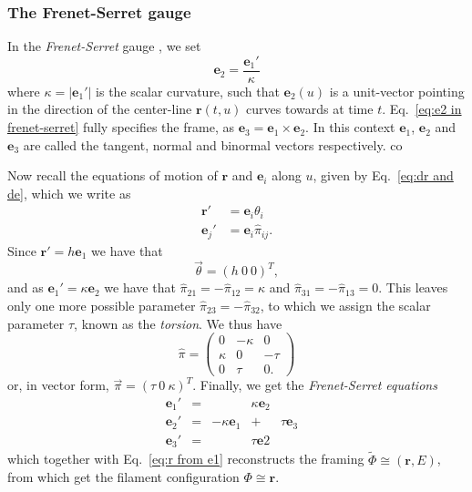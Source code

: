 \subsubsection*{The Frenet-Serret gauge}

In the \textit{Frenet-Serret} gauge \citep{frenetCourbesDoubleCourbure1852, serretQuelquesFormulesRelatives1851}, we set
\begin{equation} \label{eq:e2 in frenet-serret}
\mathbf{e}_2 = \frac{\mathbf{e}_1'}{\kappa}
\end{equation}
where $\kappa = |\mathbf{e}_1'|$ is the scalar curvature, such that $\mathbf{e}_2(u)$ is a unit-vector pointing in the direction of the center-line $\mathbf{r}(t,u)$ curves towards at time $t$. Eq.~\ref{eq:e2 in frenet-serret} fully specifies the frame, as $\mathbf{e}_3 = \mathbf{e}_1 \times \mathbf{e}_2$. In this context $\mathbf{e}_1$, $\mathbf{e}_2$ and $\mathbf{e}_3$ are called the tangent, normal and binormal vectors respectively. co

Now recall the equations of motion of $\mathbf{r}$ and $\mathbf{e}_i$ along $u$, given by Eq.~\ref{eq:dr and de}, which we write as
\begin{subequations}
\begin{align}
\mathbf{r}' & = \mathbf{e}_i \theta_i \\
\mathbf{e}_j' & = \mathbf{e}_i \hat{\pi}_{ij}.
\end{align}
\end{subequations}
Since $\mathbf{r}' = h \mathbf{e}_1$ we have that
\begin{equation} \label{eq:theta for filament}
\vec{\theta} = (h\ 0\ 0)^T,
\end{equation}
and as $\mathbf{e}_1' = \kappa \mathbf{e}_2$ we have that $\hat{\pi}_{21} = - \hat{\pi}_{12} = \kappa$ and $\hat{\pi}_{31} = -\hat{\pi}_{13} = 0$. This leaves only one more possible parameter $\hat{\pi}_{23} = -\hat{\pi}_{32}$, to which we assign the scalar parameter $\tau$, known as the \textit{torsion}. We thus have
\begin{equation} \label{eq:pi for filament}
\hat{\pi} = \begin{pmatrix}
0 & - \kappa & 0 \\
\kappa & 0 & - \tau \\
0 & \tau & 0.
\end{pmatrix}
\end{equation}
or, in vector form, $\vec{\pi} = (\tau\ 0\ \kappa)^T$. Finally, we get the \textit{Frenet-Serret equations}
\begin{equation} \label{eq:frennet-serret equations}
\begin{matrix}
\mathbf{e}_1' & = & & \kappa \mathbf{e}_2 & \\
\mathbf{e}_2' & = & - \kappa \mathbf{e}_1 & + & \tau \mathbf{e}_3 & \\
\mathbf{e}_3' & = &  & \tau \mathbf{e}2  &
\end{matrix}
\end{equation}
which together with Eq.~\ref{eq:r from e1} reconstructs the framing $\tilde{\Phi} \cong (\mathbf{r}, E)$, from which get the filament configuration $\Phi \cong \mathbf{r}$.

